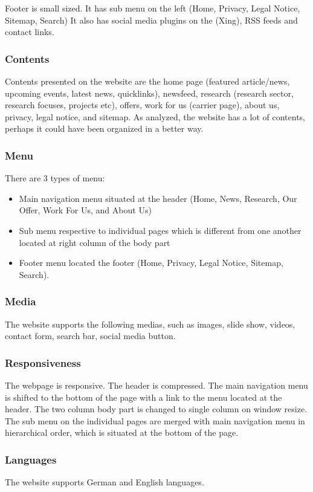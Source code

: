 Footer is small sized. It has sub menu on the left (Home, Privacy, Legal Notice, Sitemap, Search) It also has social media plugins on the (Xing), RSS feeds and contact links.

\subsubsection*{Contents}
Contents presented on the website are the home page (featured article/news, upcoming events, latest news, quicklinks), newsfeed, research (research sector, research focuses, projects etc), offers, work for us (carrier page), about us, privacy, legal notice, and sitemap. As analyzed, the website has a lot of contents, perhaps it could have been organized in a better way.

\subsubsection*{Menu}
There are 3 types of menu:
\begin{itemize}
\item Main navigation menu situated at the header (Home, News, Research, Our Offer, Work For Us, and About Us)
\item Sub menu respective to individual pages which is different from one another located at right column of the body part
\item Footer menu located the footer (Home, Privacy, Legal Notice, Sitemap, Search).
\end{itemize}

\subsubsection*{Media}
The website supports the following medias, such as images, slide show, videos, contact form, search bar, social media button.

\subsubsection*{Responsiveness}
The webpage is responsive. The header is compressed. The main navigation menu is shifted to the bottom of the page with a link to the menu located at the header. The two column body part is changed to single column on window resize. The sub menu on the individual pages are merged with main navigation menu in hierarchical order, which is situated at the bottom of the page.

\subsubsection*{Languages}
The website supports German and English languages.

